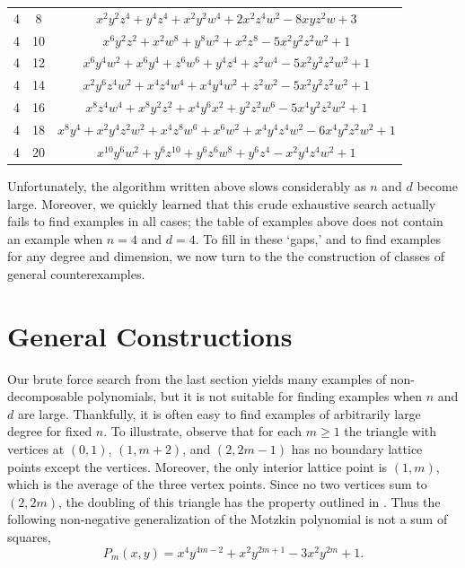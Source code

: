 \documentclass[oneside,hidelinks,indentfirst,10pt]{book}
\begin{document}
\begin{center}
\begin{tabular}{|c|c|c|}
    4 & 8 & \(x^2y^2z^4+y^4z^4+x^2y^2w^4+2x^2z^4w^2-8xyz^2w+3\)\\
    4 & 10 & \(x^6y^2z^2+x^2w^8+y^8w^2+x^2z^8-5x^2y^2z^2w^2+1\)\\
    4 & 12 & \(x^6y^4w^2+x^6y^4+z^6w^6+y^4z^4+z^2w^4-5x^2y^2z^2w^2+1\)\\
    4 & 14 & \(x^2y^6z^4w^2+x^4z^4w^4+x^4y^4w^2+z^2w^2-5x^2y^2z^2w^2+1\)\\
    4 & 16 & \(x^8z^4w^4+x^8y^2z^2+x^4y^6x^2+y^2z^2w^6-5x^4y^2z^2w^2+1\)\\
    4 & 18 & \(x^8y^4+x^2y^4z^2w^2+x^4z^8w^6+x^6w^2+x^4y^4z^4w^2-6x^4y^2z^2w^2+1\)\\
    4 & 20 & \(x^{10}y^6w^2+y^6z^{10}+y^6z^6w^8+y^6z^4-x^2y^4z^4w^2+1\)\\
    \hline
\end{tabular}
\end{center}
\bigskip
\setlength\parindent{15pt}

Unfortunately, the algorithm written above slows considerably as \(n\) and \(d\) become large. Moreover, we quickly learned that this crude exhaustive search actually fails to find examples in all cases; the table of examples above does not contain an example when \(n=4\) and \(d=4\). To fill in these `gaps,' and to find examples for any degree and dimension, we now turn to the the construction of classes of general counterexamples.



\section{General Constructions}\label{sec:gen}


Our brute force search from the last section yields many examples of non-decomposable polynomials, but it is not suitable for finding examples when \(n\) and \(d\) are large. Thankfully, it is often easy to find examples of arbitrarily large degree for fixed \(n\). To illustrate, observe that for each \(m\geq1\) the triangle with vertices at \((0,1)\), \((1,m+2)\), and \((2,2m-1)\) has no boundary lattice points except the vertices. Moreover, the only interior lattice point is \((1,m)\), which is the average of the three vertex points. Since no two vertices sum to \((2,2m)\), the doubling of this triangle has the property outlined in . Thus the following non-negative generalization of the Motzkin polynomial is not a sum of squares,
\[
    P_m(x,y)=x^4y^{4m-2}+x^2y^{2m+1}-3x^2y^{2m}+1.
\]
\end{document}
